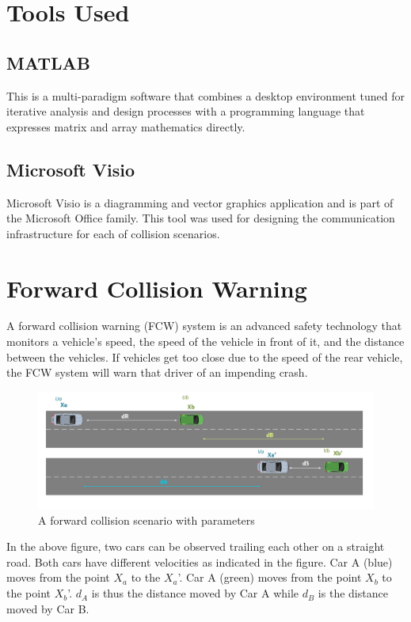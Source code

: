 \documentclass[12pt]{report}
\begin{document}
\section{Tools Used}
	\subsection{MATLAB}
	This is a multi-paradigm software that combines a desktop environment tuned for iterative analysis and design processes with a programming language that expresses matrix and array mathematics directly.
	
	\subsection{Microsoft Visio}
	Microsoft Visio is a diagramming and vector graphics application and is part of the Microsoft Office family. This tool was used for designing the communication infrastructure for each of collision scenarios.
	
\section{Forward Collision Warning}
A forward collision warning (FCW) system is an advanced safety technology that monitors a vehicle's speed, the speed of the vehicle in front of it, and the distance between the vehicles. If vehicles get too close due to the speed of the rear vehicle, the FCW system will warn that driver of an impending crash.

	\begin{figure}[!hb]
		\includegraphics[width=1.0\textwidth]{forwardcollision.png}
		\caption{A forward collision scenario with parameters}
		\label{fig}
	\end{figure}

In the above figure, two cars can be observed trailing each other on a straight road. Both cars have different velocities as indicated in the figure. Car A (blue) moves from the point $X_a$ to the $X_a$’. Car A (green) moves from the point $X_b$ to the point $X_b$’. $d_A$ is thus the distance moved by Car A while $d_B$ is the distance moved by Car B.
\end{document}
